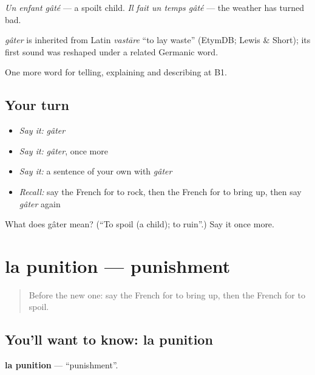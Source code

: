 \emph{Un enfant gâté} — a spoilt child. \emph{Il fait un temps gâté} — the weather has turned bad.

\begin{cousinweb}
\emph{gâter} is inherited from Latin \emph{vastāre} \textquotedblleft{}to lay waste\textquotedblright{} (EtymDB; Lewis \& Short); its first sound was reshaped under a related Germanic word.
\end{cousinweb}

\begin{grammarlens}[title={What you've built}]
One more word for telling, explaining and describing at B1.
\end{grammarlens}

\subsection*{Your turn}
\begin{itemize}
\raggedright
  \item \emph{Say it:} \emph{gâter}
  \item \emph{Say it:} \emph{gâter}, once more
  \item \emph{Say it:} a sentence of your own with \emph{gâter}
  \item \emph{Recall:} say the French for to rock, then the French for to bring up, then say \emph{gâter} again
\end{itemize}

\begin{tcolorbox}[breakable,colback=teal!4,colframe=teal!35!black,title={Before you move on}]
What does gâter mean? (\textquotedblleft{}To spoil (a child); to ruin\textquotedblright{}.) Say it once more.
\end{tcolorbox}
\section[la punition]{la punition — punishment}

\label{lesson:FR-C494-punition}



\begin{quote}
Before the new one: say the French for to bring up, then the French for to spoil.
\end{quote}

\subsection*{You'll want to know: la punition}
\textbf{la punition} — \textquotedblleft{}punishment\textquotedblright{}.

